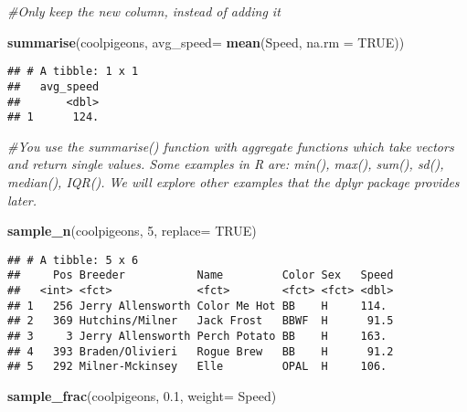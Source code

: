 \documentclass[]{article}
\newenvironment{Shaded}{\begin{snugshade}}{\end{snugshade}}
\newcommand{\KeywordTok}[1]{\textcolor[rgb]{0.13,0.29,0.53}{\textbf{#1}}}
\newcommand{\DataTypeTok}[1]{\textcolor[rgb]{0.13,0.29,0.53}{#1}}
\newcommand{\DecValTok}[1]{\textcolor[rgb]{0.00,0.00,0.81}{#1}}
\newcommand{\FloatTok}[1]{\textcolor[rgb]{0.00,0.00,0.81}{#1}}
\newcommand{\CommentTok}[1]{\textcolor[rgb]{0.56,0.35,0.01}{\textit{#1}}}
\newcommand{\OtherTok}[1]{\textcolor[rgb]{0.56,0.35,0.01}{#1}}
\newcommand{\NormalTok}[1]{#1}
\begin{document}
\begin{Shaded}
\begin{Highlighting}[]
\CommentTok{#Only keep the new column, instead of adding it}
\end{Highlighting}
\end{Shaded}

\begin{Shaded}
\begin{Highlighting}[]
\KeywordTok{summarise}\NormalTok{(coolpigeons, }\DataTypeTok{avg_speed=} \KeywordTok{mean}\NormalTok{(Speed, }\DataTypeTok{na.rm =} \OtherTok{TRUE}\NormalTok{))}
\end{Highlighting}
\end{Shaded}

\begin{verbatim}
## # A tibble: 1 x 1
##   avg_speed
##       <dbl>
## 1      124.
\end{verbatim}

\begin{Shaded}
\begin{Highlighting}[]
\CommentTok{#You use the summarise() function with aggregate functions which take vectors and return single values. Some examples in R are: min(), max(), sum(), sd(), median(), IQR(). We will explore other examples that the dplyr package provides later.}

\KeywordTok{sample_n}\NormalTok{(coolpigeons, }\DecValTok{5}\NormalTok{, }\DataTypeTok{replace=} \OtherTok{TRUE}\NormalTok{)}
\end{Highlighting}
\end{Shaded}

\begin{verbatim}
## # A tibble: 5 x 6
##     Pos Breeder           Name         Color Sex   Speed
##   <int> <fct>             <fct>        <fct> <fct> <dbl>
## 1   256 Jerry Allensworth Color Me Hot BB    H     114. 
## 2   369 Hutchins/Milner   Jack Frost   BBWF  H      91.5
## 3     3 Jerry Allensworth Perch Potato BB    H     163. 
## 4   393 Braden/Olivieri   Rogue Brew   BB    H      91.2
## 5   292 Milner-Mckinsey   Elle         OPAL  H     106.
\end{verbatim}

\begin{Shaded}
\begin{Highlighting}[]
\KeywordTok{sample_frac}\NormalTok{(coolpigeons, }\FloatTok{0.1}\NormalTok{, }\DataTypeTok{weight=}\NormalTok{ Speed)}
\end{Highlighting}
\end{Shaded}
\end{document}

